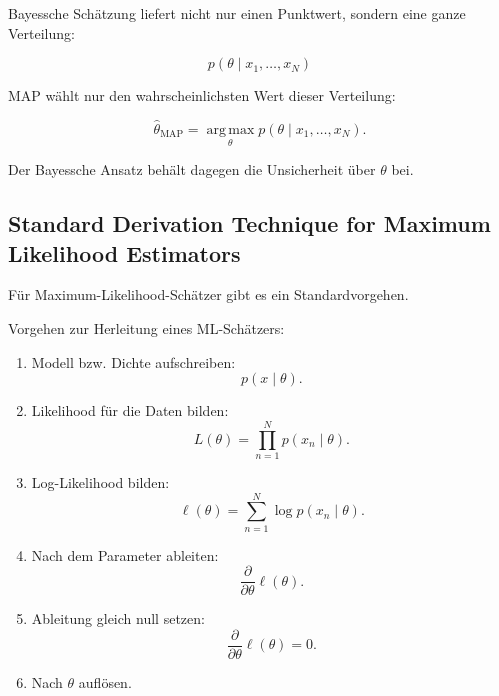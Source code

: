 \documentclass[11pt,a4paper]{scrartcl}
\begin{document}
\begin{answerbox}
    Bayessche Schätzung liefert nicht nur einen Punktwert, sondern eine ganze
    Verteilung:

    \[
        \boxed{
            p(\theta \mid x_1,\dots,x_N)
        }
    \]

    MAP wählt nur den wahrscheinlichsten Wert dieser Verteilung:

    \[
        \boxed{
            \hat\theta_{\mathrm{MAP}}
            =
            \operatorname*{arg\,max}_{\theta}
            p(\theta \mid x_1,\dots,x_N).
        }
    \]

    Der Bayessche Ansatz behält dagegen die Unsicherheit über \(\theta\) bei.
\end{answerbox}

\subsection{Standard Derivation Technique for Maximum Likelihood Estimators}

\begin{notebox}
    Für Maximum-Likelihood-Schätzer gibt es ein Standardvorgehen.
\end{notebox}

\begin{calculationbox}
    Vorgehen zur Herleitung eines ML-Schätzers:

    \begin{enumerate}
        \item Modell bzw. Dichte aufschreiben:
        \[
            p(x \mid \theta).
        \]

        \item Likelihood für die Daten bilden:
        \[
            L(\theta)
            =
            \prod_{n=1}^{N}
            p(x_n \mid \theta).
        \]

        \item Log-Likelihood bilden:
        \[
            \ell(\theta)
            =
            \sum_{n=1}^{N}
            \log p(x_n \mid \theta).
        \]

        \item Nach dem Parameter ableiten:
        \[
            \frac{\partial}{\partial \theta}
            \ell(\theta).
        \]

        \item Ableitung gleich null setzen:
        \[
            \frac{\partial}{\partial \theta}
            \ell(\theta)
            =
            0.
        \]

        \item Nach \(\theta\) auflösen.
    \end{enumerate}
\end{calculationbox}
\end{document}
